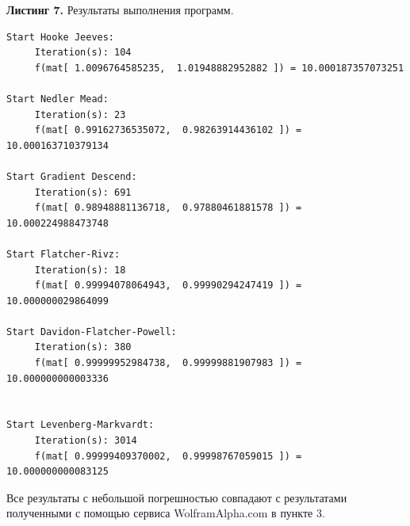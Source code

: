 \documentclass[a4paper, 12pt]{article}   	%
\begin{document}
    \textbf{Листинг 7.} Результаты выполнения программ.
    \begin{verbatim}
Start Hooke Jeeves:
	 Iteration(s): 104
	 f(mat[ 1.0096764585235,  1.01948882952882 ]) = 10.000187357073251

Start Nedler Mead:
	 Iteration(s): 23
	 f(mat[ 0.99162736535072,  0.98263914436102 ]) = 10.000163710379134

Start Gradient Descend:
	 Iteration(s): 691
	 f(mat[ 0.98948881136718,  0.97880461881578 ]) = 10.000224988473748

Start Flatcher-Rivz:
	 Iteration(s): 18
	 f(mat[ 0.99994078064943,  0.99990294247419 ]) = 10.000000029864099

Start Davidon-Flatcher-Powell:
	 Iteration(s): 380
	 f(mat[ 0.99999952984738,  0.99999881907983 ]) = 10.000000000003336


Start Levenberg-Markvardt:
	 Iteration(s): 3014
	 f(mat[ 0.99999409370002,  0.99998767059015 ]) = 10.000000000083125
	 \end{verbatim}
 
Все результаты с небольшой погрешностью совпадают с результатами полученными с помощью сервиса WolframAlpha.com в пункте 3. 
\end{document}
